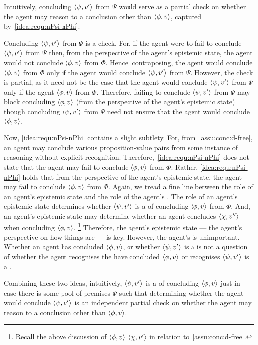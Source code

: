 \begin{note}
  Intuitively, concluding \(\langle \psi, v' \rangle\) from \(\Psi\) would serve as a partial check on whether the agent may reason to a conclusion other than \(\langle \phi, v \rangle\), captured by~\ref{idea:requ:nPsi-nPhi}.

  Concluding \(\langle \psi, v' \rangle\) from \(\Psi\) is a check.
  For, if the agent were to fail to conclude \(\langle \psi, v' \rangle\) from \(\Psi\) then, from the perspective of the agent's epistemic state, the agent would not conclude \(\langle \phi, v \rangle\) from \(\Phi\).
  Hence, contraposing, the agent would conclude \(\langle \phi, v \rangle\) from \(\Phi\) only if the agent would conclude \(\langle \psi, v' \rangle\) from \(\Psi\).
  However, the check is partial, as it need not be the case that the agent would conclude \(\langle \psi, v' \rangle\) from \(\Psi\) only if the agent \(\langle \phi, v \rangle\) from \(\Phi\).
  Therefore, failing to conclude \(\langle \psi, v' \rangle\) from \(\Psi\) may block concluding \(\langle \phi, v \rangle\) (from the perspective of the agent's epistemic state) though concluding \(\langle \psi, v' \rangle\) from \(\Psi\) need not ensure that the agent would conclude \(\langle \phi, v \rangle\).

  Now, \ref{idea:requ:nPsi-nPhi} contains a slight subtlety.
  For, from~\autoref{assu:conc:d-free}, an agent may conclude various proposition-value pairs from some instance of reasoning without explicit recognition.
  Therefore,~\ref{idea:requ:nPsi-nPhi} does not state that the agent may fail to conclude \(\langle \phi, v \rangle\) from \(\Phi\).
  Rather, \ref{idea:requ:nPsi-nPhi} holds that from the perspective of the agent's epistemic state, the agent may fail to conclude \(\langle \phi, v \rangle\) from \(\Phi\).
  Again, we tread a fine line between the role of an agent's epistemic state and the role of the agent's \stance{}.
  The role of an agent's epistemic state determines whether \(\langle \psi, v' \rangle\) is a \requ{} of concluding \(\langle \phi, v \rangle\) from \(\Phi\).
  And, an agent's epistemic state may determine whether an agent concludes \(\langle \chi, v'' \rangle\) when concluding \(\langle \phi, v \rangle\).%
  \footnote{
    Recall the above discussion of \(\langle \phi, v \rangle\) \indicatePr{} \(\langle \chi, v' \rangle\) in relation to~\autoref{assu:conc:d-free}.
  }
  Therefore, the agent's epistemic state --- the agent's perspective on how things are --- is key.
  However, the agent's \stance{} is unimportant.
  Whether an agent has concluded \(\langle \phi, v \rangle\), or whether \(\langle \psi, v' \rangle\) is a \requ{} is not a question of whether the agent recognises the have concluded \(\langle \phi, v \rangle\) or recognises \(\langle \psi, v' \rangle\) is a \requ{}.

  Combining these two ideas, intuitively, \(\langle \psi, v' \rangle\) is a \requ{} of concluding \(\langle \phi, v \rangle\) just in case there is some pool of premises \(\Psi\) such that determining whether the agent would conclude \(\langle \psi, v' \rangle\) is an independent partial check on whether the agent may reason to a conclusion other than \(\langle \phi, v \rangle\).
\end{note}


